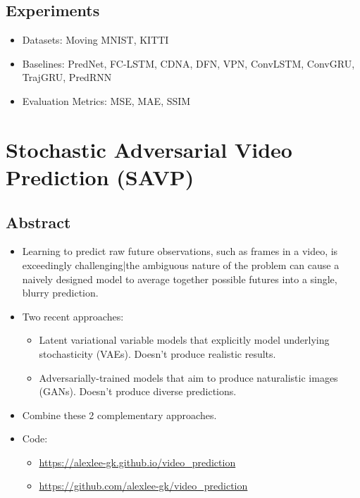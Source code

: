 \documentclass{article}
\begin{document}
    \subsection{Experiments}\label{subsec:Reduced_Gate_Convolutional_LSTM_Using_Predictive_Coding_for_Spatiotemporal_Prediction:experiments}
    \begin{itemize}
        \item Datasets: Moving MNIST, KITTI
        \item Baselines: PredNet, FC-LSTM, CDNA, DFN, VPN, ConvLSTM, ConvGRU, TrajGRU, PredRNN
        \item Evaluation Metrics: MSE, MAE, SSIM
    \end{itemize}
    \newpage


    \section{Stochastic Adversarial Video Prediction (SAVP)}\label{sec:Stochastic_Adversarial_Video_Prediction_(SAVP)}
    \subsection*{Abstract}
    \begin{itemize}
        \item Learning to predict raw future observations, such as frames in a video, is exceedingly challenging|the ambiguous nature of the problem can cause a naively designed model to average together possible futures into a single, blurry prediction.
        \item Two recent approaches:
        \begin{itemize}
            \item Latent variational variable models that explicitly model underlying stochasticity (VAEs).
            Doesn't produce realistic results.
            \item Adversarially-trained models that aim to produce naturalistic images (GANs).
            Doesn't produce diverse predictions.
        \end{itemize}
        \item Combine these 2 complementary approaches.
        \item Code:
        \begin{itemize}
            \item \url{https://alexlee-gk.github.io/video_prediction}
            \item \url{https://github.com/alexlee-gk/video_prediction}
        \end{itemize}
    \end{itemize}
\end{document}
